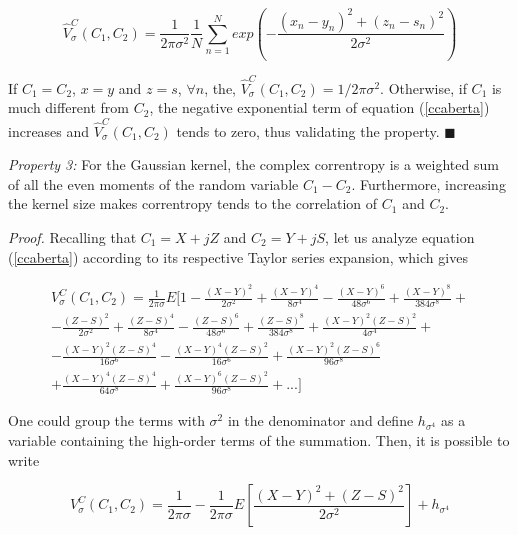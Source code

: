 \documentclass[preprint,12pt]{elsarticle}
\begin{document}
\begin{equation}\label{ccaberta}
\hat{V}^{C}_{\sigma}(C_{1},C_{2}) = \frac{1}{2\pi\sigma^{2}} \frac{1}{N} \sum\limits_{n=1}^N exp \left ( -\frac{(x_{n} - y_{n})^{2} + (z_{n} - s_{n})^{2} }{2\sigma^2} \right ) 
 \end{equation}

If $C_1 = C_2$, $x = y$ and $z=s$, $\forall n$, the, $ \hat{V}^{C}_{\sigma}(C_{1},C_{2}) = 1 / 2\pi\sigma^2 $. Otherwise, if $C_1$ is much different from $C_2$, the negative exponential term of equation (\ref{ccaberta}) increases and $\hat{V}^C_{\sigma}(C_1,C_2)$ tends to zero, thus validating the property. $\blacksquare$

\bigskip
\textit{Property 3:} For the Gaussian kernel, the complex correntropy is a weighted sum of all the even moments of the random variable $C_1 - C_2$. Furthermore, increasing the kernel size makes correntropy tends to the correlation of $C_1$ and $C_2$.


\textit{Proof.} Recalling that $C_1 = X + jZ$ and $C_2 = Y + jS$, let us analyze equation (\ref{ccaberta}) according to its respective Taylor series expansion, which gives





\begin{equation}\label{tayloraberta}
\begin{split}
V_{\sigma}^C(C_1,C_2) = \frac{1}{2\pi\sigma}  E[ 1 - \frac{(X-Y)^2}{2\sigma^2}  + \frac{(X-Y)^4}{8\sigma^4} - \frac{(X-Y)^6}{48\sigma^6} + \frac{(X-Y)^8}{384\sigma^8} +\\
-  \frac{(Z-S)^2}{2\sigma^2} + \frac{(Z-S)^4}{8\sigma^4} - \frac{(Z-S)^6}{48\sigma^6} + \frac{(Z-S)^8}{384\sigma^8} + \frac{(X-Y)^2 (Z-S)^2}{4\sigma^4} + \\
- \frac{(X-Y)^2 (Z-S)^4}{16\sigma^6} - \frac{(X-Y)^4 (Z-S)^2}{16\sigma^6} + \frac{(X-Y)^2 (Z-S)^6 }{96\sigma^8}\\
+ \frac{(X-Y)^4 (Z-S)^4}{64\sigma^8} + \frac{(X-Y)^6 (Z-S)^2 }{ 96\sigma^8 } + ... ]
\end{split}
\end{equation}


One could group the terms with $\sigma^2$ in the denominator and define $h_{\sigma^4}$ as a variable containing the high-order terms of the summation. Then, it is possible to write


\begin{equation}\label{taylor}
V_{\sigma}^C(C_1,C_2) = \frac{1}{2\pi\sigma}   - \frac{1}{2\pi\sigma} E[ \frac{(X - Y)^2 + (Z-S)^2}{2\sigma^2}]  + h_{\sigma^4}
\end{equation}
\end{document}
